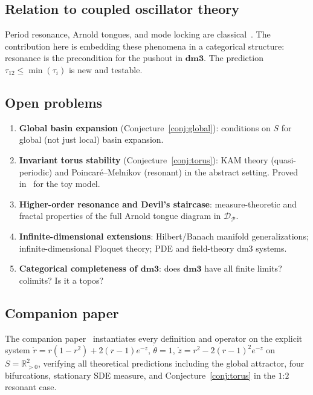 \documentclass[12pt, oneside]{book}
\theoremstyle{plain}
\theoremstyle{definition}
\theoremstyle{remark}
\newcommand{\R}{\mathbb{R}}
\newcommand{\dmcat}{\mathbf{dm3}}
\newcommand{\cP}{\mathcal{P}}
\newcommand{\cD}{\mathcal{D}}
\begin{document}
\subsection{Relation to coupled oscillator theory}

Period resonance, Arnold tongues, and mode locking are
classical~\cite{PRK,Izhikevich}. The contribution here is embedding
these phenomena in a categorical structure: resonance is the
precondition for the pushout in $\dmcat$. The prediction
$\tau_{12}\le\min(\tau_i)$ is new and testable.

\subsection{Open problems}

\begin{enumerate}[label=(\arabic*),leftmargin=*]
\item \textbf{Global basin expansion} (Conjecture~\ref{conj:global}):
  conditions on $S$ for global (not just local) basin expansion.

\item \textbf{Invariant torus stability} (Conjecture~\ref{conj:torus}):
  KAM theory (quasi-periodic) and Poincar\'e--Melnikov
  (resonant) in the abstract setting. Proved in~\cite{Paper2}
  for the toy model.

\item \textbf{Higher-order resonance and Devil's staircase}:
  measure-theoretic and fractal properties of the full Arnold
  tongue diagram in $\cD_\cP$.

\item \textbf{Infinite-dimensional extensions}: Hilbert/Banach
  manifold generalizations; infinite-dimensional Floquet theory;
  PDE and field-theory dm3 systems.

\item \textbf{Categorical completeness of $\dmcat$}: does $\dmcat$
  have all finite limits? colimits? Is it a topos?
\end{enumerate}

\subsection{Companion paper}

The companion paper~\cite{Paper2} instantiates every definition and
operator on the explicit system
$\dot r=r(1-r^2)+2(r-1)e^{-z}$,
$\dot\theta=1$,
$\dot z=r^2-2(r-1)^2e^{-z}$
on $S=\R^2_{>0}$, verifying all theoretical predictions including
the global attractor, four bifurcations, stationary SDE measure,
and Conjecture~\ref{conj:torus} in the $1$:$2$ resonant case.
\end{document}

